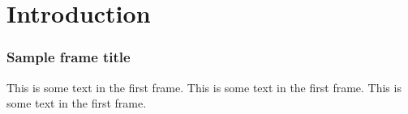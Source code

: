 \section{Introduction}

\begin{frame}
	\frametitle{Sample frame title}
	This is some text in the first frame. This is some text in the first frame.
	This is some text in the first frame.
\end{frame}
